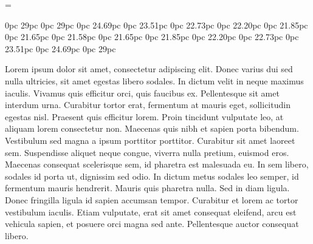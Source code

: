 \baselineskip=11pt
\parindent=0pt
\newskip\varunit
\varunit=0.989pt
=

0pc 29pc
0pc 29pc
0pc 24.69pc
0pc 23.51pc
0pc 22.73pc
0pc 22.20pc
0pc 21.85pc
0pc 21.65pc
0pc 21.58pc
0pc 21.65pc
0pc 21.85pc
0pc 22.20pc
0pc 22.73pc
0pc 23.51pc
0pc 24.69pc
0pc 29pc
\leavevmode{}%
\strut  Lorem ipsum dolor sit amet, consectetur adipiscing elit.
Donec varius dui sed nulla ultricies, sit amet egestas libero sodales.
In dictum velit in neque maximus iaculis. Vivamus quis efficitur orci,
quis faucibus ex. Pellentesque sit amet interdum urna. Curabitur tortor erat,
fermentum at mauris eget, sollicitudin egestas nisl. Praesent quis efficitur lorem.
Proin tincidunt vulputate leo, at aliquam lorem consectetur non.
Maecenas quis nibh et sapien porta bibendum.
Vestibulum sed magna a ipsum porttitor porttitor.
Curabitur sit amet laoreet sem. Suspendisse aliquet neque congue,
viverra nulla pretium, euismod eros. Maecenas consequat scelerisque sem,
id pharetra est malesuada eu. In sem libero, sodales id porta ut, dignissim sed odio.
In dictum metus sodales leo semper, id fermentum mauris hendrerit.
Mauris quis pharetra nulla. Sed in diam ligula.
Donec fringilla ligula id sapien accumsan tempor.
Curabitur et lorem ac tortor vestibulum iaculis.
Etiam vulputate, erat sit amet consequat eleifend, arcu est vehicula sapien,
et posuere orci magna sed ante.
Pellentesque auctor consequat libero.

\bye
